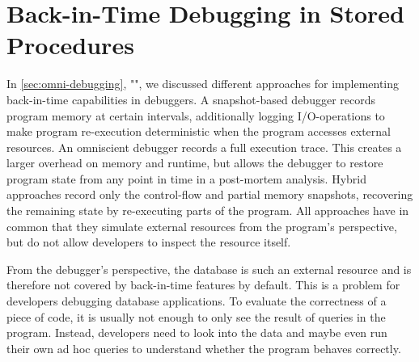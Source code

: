 \tmpEnd

%
%
%
%
%

\section{Back-in-Time Debugging in Stored Procedures}

In \cref{sec:omni-debugging}, "", we discussed different approaches for implementing back-in-time capabilities in debuggers.
A snapshot-based debugger records program memory at certain intervals, additionally logging I/O-operations to make program re-execution deterministic when the program accesses external resources.
An omniscient debugger records a full execution trace.
This creates a larger overhead on memory and runtime, but allows the debugger to restore program state from any point in time in a post-mortem analysis.
Hybrid approaches record only the control-flow and partial memory snapshots, recovering the remaining state by re-executing parts of the program.
All approaches have in common that they simulate external resources from the program's perspective, but do not allow developers to inspect the resource itself.

From the debugger's perspective, the database is such an external resource and is therefore not covered by back-in-time features by default.
This is a problem for developers debugging database applications.
To evaluate the correctness of a piece of code, it is usually not enough to only see the result of queries in the program.
Instead, developers need to look into the data and maybe even run their own ad hoc queries to understand whether the program behaves correctly.

